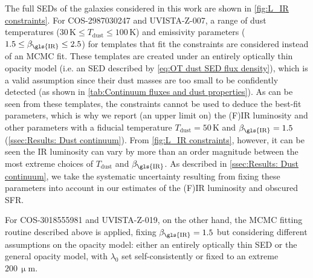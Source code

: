 The full \glspl{SED} of the galaxies considered in this work are shown in \cref{fig:L_IR constraints}. For COS-2987030247 and UVISTA-Z-007, a range of dust temperatures ($30 \, \mathrm{K} \leq T_\text{dust} \leq 100 \, \mathrm{K}$) and emissivity parameters ($1.5 \leq \beta_\text{\gls{IR}} \leq 2.5$)\rs{[would it be more consistent to fix beta=1.5 here too??]} for templates that fit the constraints are considered instead of an \gls{MCMC} fit. These templates are created under an entirely optically thin opacity model (i.e. an \gls{SED} described by \cref{eq:OT dust SED flux density}), which is a valid assumption since their dust masses are too small to be confidently detected (as shown in \cref{tab:Continuum fluxes and dust properties}). As can be seen from these templates, the constraints cannot be used to deduce the best-fit parameters, which is why we report (an upper limit on) the (F)IR luminosity and other parameters with a fiducial temperature $T_\text{dust} = 50 \, \mathrm{K}$ and $\beta_\text{\gls{IR}} = 1.5$ (\cref{ssec:Results: Dust continuum}). From \cref{fig:L_IR constraints}, however, it can be seen the \gls{IR} luminosity can vary by more than an order magnitude between the most extreme choices of $T_\text{dust}$ and $\beta_\text{\gls{IR}}$. As described in \cref{ssec:Results: Dust continuum}, we take the systematic uncertainty resulting from fixing these parameters into account in our estimates of the (F)IR luminosity and obscured \gls{SFR}.

For COS-3018555981 and UVISTA-Z-019, on the other hand, the \gls{MCMC} fitting routine described above is applied, fixing $\beta_\text{\gls{IR}} = 1.5$ but considering different assumptions on the opacity model: either an entirely optically thin \gls{SED} or the general opacity model, with $\lambda_0$ set self-consistently or fixed to an extreme $200 \, \mathrm{\upmu m}$.